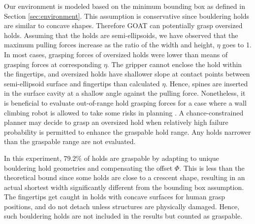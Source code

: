 \documentclass[letterpaper, 10 pt, conference]{ieeeconf}  %
\begin{document}
Our environment is modeled based on the minimum bounding box as defined in Section \ref{sec:environment}. This assumption is conservative since bouldering holds are similar to concave shapes. Therefore GOAT can potentially grasp oversized holds. 
Assuming that the holds are semi-ellipsoids, we have observed that the maximum pulling forces increase as the ratio of the width and height, $\eta$ goes to 1. In most cases, grasping forces of oversized holds were lower than means of grasping forces at corresponding $\eta$. %
The gripper cannot enclose the hold within the fingertips, and oversized holds have shallower slope at contact points between semi-ellipsoid surface and fingertips than calculated $\eta$.
Hence, spines are inserted in the surface cavity at a shallow angle against the pulling force. Nonetheless, it is beneficial to evaluate out-of-range hold grasping forces for a case where a wall climbing robot is allowed to take some risks in planning \cite{risk_aware}. A chance-constrained planner may decide to grasp an oversized hold when relatively high failure probability is permitted to enhance the graspable hold range. Any holds narrower than the graspable range are not evaluated. %

In this experiment, $79.2 \%$ of holds are graspable by adapting to unique bouldering hold geometries and compensating the offset $\Phi$.
This is less than the theoretical bound since some holds are close to a crescent shape, resulting in an actual shortest width significantly different from the bounding box assumption. %
The fingertips get caught in holds with concave surfaces for human grasp positions, and do not detach unless structures are physically damaged. Hence, such bouldering holds are not included in the results but counted as graspable. 
\end{document}
